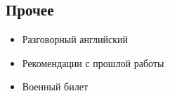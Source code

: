 \documentclass[11pt, a4paper]{article}
\newcommand{\Delimitline}{
  \vspace{-2ex}
  \noindent\makebox[\linewidth]{\rule{\DelimitlineLength}{0.12ex}} }
\begin{document}
\vspace{0ex}

\subsection*{Прочее}
\Delimitline

\begin{itemize}
  \item Разговорный английский
  \item Рекомендации с прошлой работы
  \item Военный билет
\end{itemize}
\end{document}
